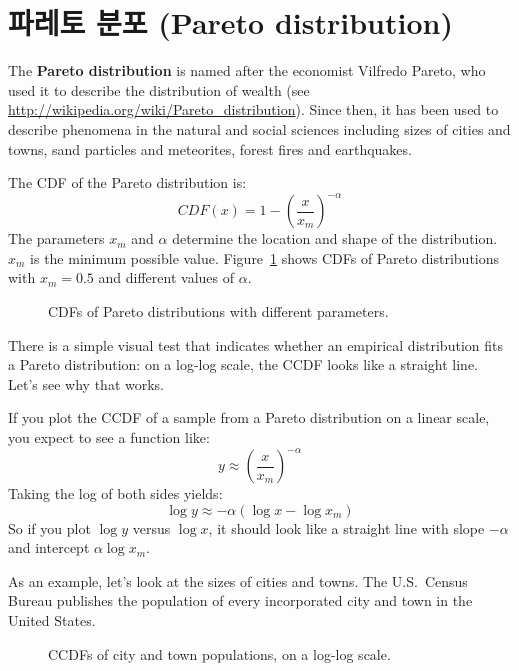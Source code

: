 \section{파레토 분포 (Pareto distribution)}

The {\bf Pareto distribution} is named after the economist Vilfredo Pareto,
who used it to describe the distribution of wealth (see
\url{http://wikipedia.org/wiki/Pareto_distribution}).  Since then, it
has been used to describe phenomena in the natural and social sciences
including sizes of cities and towns, sand particles and meteorites,
forest fires and earthquakes.  

The CDF of the Pareto distribution is:
%
\[ CDF(x) = 1 - \left( \frac{x}{x_m} \right) ^{-\alpha} \]
%
The parameters $x_{m}$ and $\alpha$ determine the location and shape
of the distribution. $x_{m}$ is the minimum possible value.
Figure~\ref{analytic_pareto_cdf} shows CDFs of Pareto
distributions with $x_{m} = 0.5$ and different values
of $\alpha$.

\begin{figure}
\caption{CDFs of Pareto distributions with different parameters.}
\label{analytic_pareto_cdf}
\end{figure}

There is a simple visual test that indicates whether an empirical
distribution fits a Pareto distribution: on a log-log scale, the CCDF
looks like a straight line.  Let's see why that works.

If you plot the CCDF of a sample from a Pareto distribution on a
linear scale, you expect to see a function like:
%
\[ y \approx \left( \frac{x}{x_m} \right) ^{-\alpha} \]
%
Taking the log of both sides yields:
%
\[ \log y \approx -\alpha (\log x - \log x_{m})\]
%
So if you plot $\log y$ versus $\log x$, it should look like a straight
line with slope $-\alpha$ and intercept
$\alpha \log x_{m}$.

As an example, let's look at the sizes of cities and towns.
The U.S.~Census Bureau publishes the
population of every incorporated city and town in the United States.
 
  

\begin{figure}
\caption{CCDFs of city and town populations, on a log-log scale.}
\label{populations_pareto}
\end{figure}

